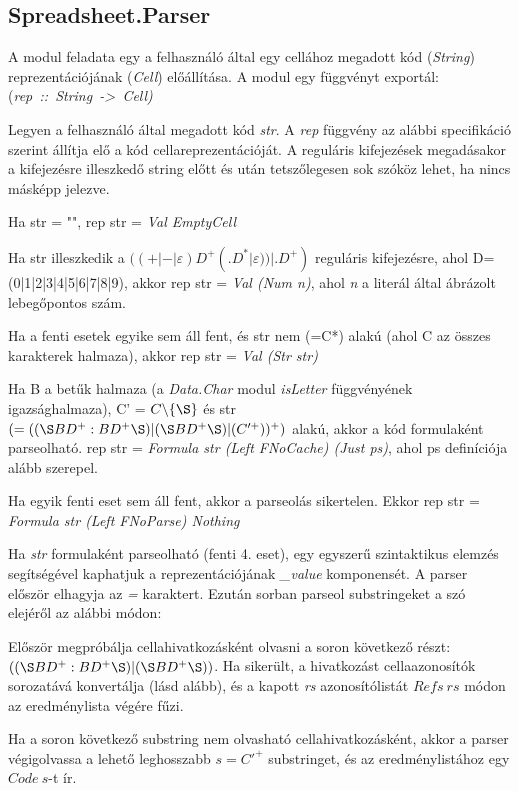 \subsection{Spreadsheet.Parser}

A modul feladata egy a felhasználó által egy cellához megadott kód (\textit{String}) reprezentációjának (\textit{Cell}) előállítása. A modul egy függvényt exportál: \mbox{(\textit{rep :: String -> Cell)}}

Legyen a felhasználó által megadott kód \textit{str}. A \textit{rep} függvény az alábbi specifikáció szerint állítja elő a kód cellareprezentációját. A reguláris kifejezések megadásakor a kifejezésre illeszkedő string előtt és után tetszőlegesen sok szóköz lehet, ha nincs másképp jelezve.

\begin{compactenum}
	\item Ha str = "", rep str = \textit{Val EmptyCell}
	\item Ha str illeszkedik a $((+|-|\varepsilon)D^+(.D^*|\varepsilon))|.D^+)$ reguláris kifejezésre, ahol D=(0|1|2|3|4|5|6|7|8|9), akkor rep str = \textit{Val (Num n)}, ahol \textit{n} a literál által ábrázolt lebegőpontos szám. 
	\item Ha a fenti esetek egyike sem áll fent, és str nem (=C*) alakú (ahol C az összes karakterek halmaza), akkor rep str = \textit{Val (Str str)}
	\item Ha B a betűk halmaza (a \textit{Data.Char} modul \textit{isLetter} függvényének igazsághalmaza), C' = $C \backslash \{\S\}$ és str $(=((\S  BD^+:BD^+\S )|(\S BD^+\S )|(C'^+))^+)$ alakú, akkor a kód formulaként parseolható. rep str = \textit{Formula str (Left FNoCache) (Just ps)}, ahol ps definíciója alább szerepel.
	\item Ha egyik fenti eset sem áll fent, akkor a parseolás sikertelen. Ekkor rep str = \textit{Formula str (Left FNoParse) Nothing}
\end{compactenum}

Ha \textit{str} formulaként parseolható (fenti 4. eset), egy egyszerű szintaktikus elemzés segítségével kaphatjuk a reprezentációjának \textit{\_value} komponensét. A parser először elhagyja az \textit{=} karaktert. Ezután sorban parseol substringeket a szó elejéről az alábbi módon:
\begin{compactenum}
	\item Először megpróbálja cellahivatkozásként olvasni a soron következő részt: $((\S  BD^+:BD^+\S )|(\S BD^+\S ))$. Ha sikerült, a hivatkozást cellaazonosítók sorozatává konvertálja (lásd alább), és a kapott \textit{rs} azonosítólistát $Refs\ rs$ módon az eredménylista végére fűzi.
	\item Ha a soron következő substring nem olvasható cellahivatkozásként, akkor a parser végigolvassa a lehető leghosszabb $s = C'^+$ substringet, és az eredménylistához egy $Code\ s$-t ír.
\end{compactenum}

